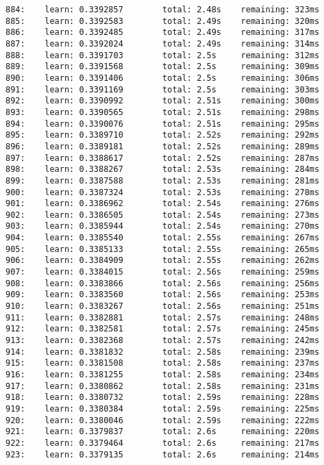 \documentclass[11pt]{article}
\begin{document}
\begin{Verbatim}[commandchars=\\\{\}]
884:    learn: 0.3392857        total: 2.48s    remaining: 323ms
885:    learn: 0.3392583        total: 2.49s    remaining: 320ms
886:    learn: 0.3392485        total: 2.49s    remaining: 317ms
887:    learn: 0.3392024        total: 2.49s    remaining: 314ms
888:    learn: 0.3391703        total: 2.5s     remaining: 312ms
889:    learn: 0.3391568        total: 2.5s     remaining: 309ms
890:    learn: 0.3391406        total: 2.5s     remaining: 306ms
891:    learn: 0.3391169        total: 2.5s     remaining: 303ms
892:    learn: 0.3390992        total: 2.51s    remaining: 300ms
893:    learn: 0.3390565        total: 2.51s    remaining: 298ms
894:    learn: 0.3390076        total: 2.51s    remaining: 295ms
895:    learn: 0.3389710        total: 2.52s    remaining: 292ms
896:    learn: 0.3389181        total: 2.52s    remaining: 289ms
897:    learn: 0.3388617        total: 2.52s    remaining: 287ms
898:    learn: 0.3388267        total: 2.53s    remaining: 284ms
899:    learn: 0.3387588        total: 2.53s    remaining: 281ms
900:    learn: 0.3387324        total: 2.53s    remaining: 278ms
901:    learn: 0.3386962        total: 2.54s    remaining: 276ms
902:    learn: 0.3386505        total: 2.54s    remaining: 273ms
903:    learn: 0.3385944        total: 2.54s    remaining: 270ms
904:    learn: 0.3385540        total: 2.55s    remaining: 267ms
905:    learn: 0.3385133        total: 2.55s    remaining: 265ms
906:    learn: 0.3384909        total: 2.55s    remaining: 262ms
907:    learn: 0.3384015        total: 2.56s    remaining: 259ms
908:    learn: 0.3383866        total: 2.56s    remaining: 256ms
909:    learn: 0.3383560        total: 2.56s    remaining: 253ms
910:    learn: 0.3383267        total: 2.56s    remaining: 251ms
911:    learn: 0.3382881        total: 2.57s    remaining: 248ms
912:    learn: 0.3382581        total: 2.57s    remaining: 245ms
913:    learn: 0.3382368        total: 2.57s    remaining: 242ms
914:    learn: 0.3381832        total: 2.58s    remaining: 239ms
915:    learn: 0.3381508        total: 2.58s    remaining: 237ms
916:    learn: 0.3381255        total: 2.58s    remaining: 234ms
917:    learn: 0.3380862        total: 2.58s    remaining: 231ms
918:    learn: 0.3380732        total: 2.59s    remaining: 228ms
919:    learn: 0.3380384        total: 2.59s    remaining: 225ms
920:    learn: 0.3380046        total: 2.59s    remaining: 222ms
921:    learn: 0.3379837        total: 2.6s     remaining: 220ms
922:    learn: 0.3379464        total: 2.6s     remaining: 217ms
923:    learn: 0.3379135        total: 2.6s     remaining: 214ms

\end{Verbatim}
\end{document}

